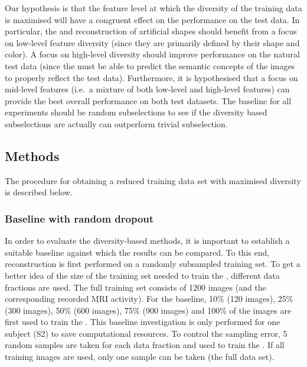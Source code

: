 Our hypothesis is that the feature level at which the diversity of the training data is maximised will have a congruent effect on the performance on the test data. In particular, the  and reconstruction of artificial shapes should benefit from a focus on low-level feature diversity (since they are primarily defined by their shape and color). A focus on high-level diversity should improve performance on the natural test data (since the  must be able to predict the semantic concepts of the images to properly reflect the test data). Furthermore, it is hypothesised that a focus on mid-level features (i.e.\ a mixture of both low-level and high-level features) can provide the best overall performance on both test datasets. The baseline for all experiments should be random subselections to see if the diversity based subselections are actually can outperform trivial subselection.



\subsection{Methods}

The procedure for obtaining a reduced training data set with maximised diversity is described below.

\subsubsection{Baseline with random dropout}

In order to evaluate the diversity-based methods, it is important to establish a suitable baseline against which the results can be compared. To this end, reconstruction is first performed on a randomly subsampled training set. To get a better idea of the size of the training set needed to train the , different data fractions are used. The full training set consists of 1200 images (and the corresponding recorded MRI activity). For the baseline, 10\% (120 images), 25\% (300 images), 50\% (600 images), 75\% (900 images) and 100\% of the images are first used to train the . This baseline investigation is only performed for one subject (S2) to save computational resources. To control the sampling error, 5 random samples are taken for each data fraction and used to train the . If all training images are used, only one sample can be taken (the full data set). 

